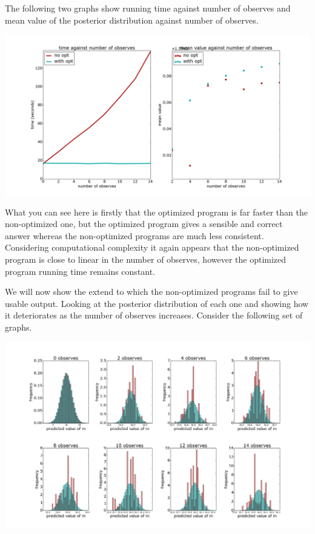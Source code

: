\documentclass[a4paper]{article}
\begin{document}
The following two graphs show running time against number of observes and mean value of the posterior distribution against number of observes.

\centerline{\includegraphics[width=16cm]{images/removing_observes_1.png}}

What you can see here is firstly that the optimized program is far faster than the non-optimized one, but the optimized program gives a sensible and correct answer whereas the non-optimized programs are much less consistent. Considering computational complexity it again appears that the non-optimized program is close to linear in the number of observes, however the optimized program running time remains constant.

We will now show the extend to which the non-optimized programs fail to give usable output. Looking at the posterior distribution of each one and showing how it deteriorates as the number of observes increases. Consider the following set of graphs.

\centerline{\includegraphics[width=16cm]{images/removing_observes_2.png}}
\end{document}
